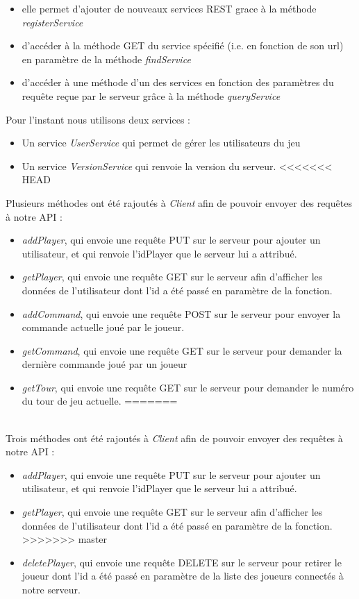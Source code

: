 \documentclass[a4paper,12pt]{article}
\begin{document}
\begin{itemize}
\item elle permet d'ajouter de nouveaux services REST grace à la méthode \emph{registerService}
\item d'accéder à la méthode GET du service spécifié (i.e. en fonction de son url) en paramètre de la méthode \emph{findService}
\item  d'accéder à une méthode d'un des services en fonction des paramètres du requête reçue par le serveur grâce à la méthode \emph{queryService}
\end{itemize}
    
    Pour l'instant nous utilisons deux services :
    
\begin{itemize}
\item Un service \emph{UserService} qui permet de gérer les utilisateurs du jeu
\item Un service \emph{VersionService} qui renvoie la version du serveur.
<<<<<<< HEAD
\end{itemize} 

    Plusieurs méthodes ont été rajoutés à \emph{Client} afin de pouvoir envoyer des requêtes à notre API : \begin{itemize}
        \item \emph{addPlayer}, qui envoie une requête PUT sur le serveur pour ajouter un utilisateur, et qui renvoie l'idPlayer que le serveur lui a attribué.
        \item \emph{getPlayer}, qui envoie une requête GET sur le serveur afin d'afficher les données de l'utilisateur dont l'id a été passé en paramètre de la fonction.
        \item \emph{addCommand}, qui envoie une requête POST sur le serveur pour envoyer la commande actuelle joué par le joueur.
        \item \emph{getCommand}, qui envoie une requête GET sur le serveur pour demander la dernière commande joué par un joueur
        \item \emph{getTour}, qui envoie une requête GET sur le serveur pour demander le numéro du tour de jeu actuelle.
=======
\end{itemize} \\

    Trois méthodes ont été rajoutés à \emph{Client} afin de pouvoir envoyer des requêtes à notre API : \begin{itemize}
        \item \emph{addPlayer}, qui envoie une requête PUT sur le serveur pour ajouter un utilisateur, et qui renvoie l'idPlayer que le serveur lui a attribué.
        \item \emph{getPlayer}, qui envoie une requête GET sur le serveur afin d'afficher les données de l'utilisateur dont l'id a été passé en paramètre de la fonction.
>>>>>>> master
        \item \emph{deletePlayer}, qui envoie une requête DELETE sur le serveur pour retirer le joueur dont l'id a été passé en paramètre de la liste des joueurs connectés à notre serveur.
    \end{itemize}
    
\end{document}
